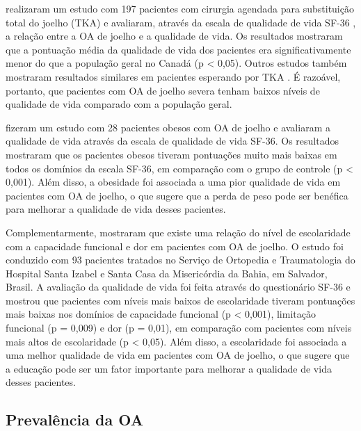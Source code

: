 \cite{Desmeules2009} realizaram um estudo com 197 pacientes com cirurgia agendada para substituição total do joelho (TKA) e avaliaram, através da escala de qualidade de vida SF-36 \citep{Ware1992}, a relação entre a OA de joelho e a qualidade de vida. Os resultados mostraram que a pontuação média da qualidade de vida dos pacientes era significativamente menor do que a população geral no Canadá (p < 0,05). Outros estudos também mostraram resultados similares em pacientes esperando por TKA \citep{Snider2005,Kapetanakis2011}. É razoável, portanto, que pacientes com OA de joelho severa tenham baixos níveis de qualidade de vida comparado com a população geral.

\cite{Sutbeyaz2007} fizeram um estudo com 28 pacientes obesos com OA de joelho e avaliaram a qualidade de vida através da escala de qualidade de vida SF-36. Os resultados mostraram que os pacientes obesos tiveram pontuações muito mais baixas em todos os domínios da escala SF-36, em comparação com o grupo de controle (p < 0,001). Além disso, a obesidade foi associada a uma pior qualidade de vida em pacientes com OA de joelho, o que sugere que a perda de peso pode ser benéfica para melhorar a qualidade de vida desses pacientes.

Complementarmente, \cite{Kawano2015} mostraram que existe uma relação do nível de escolaridade com a capacidade funcional e dor em pacientes com OA de joelho. O estudo foi conduzido com 93 pacientes tratados no Serviço de Ortopedia e Traumatologia do Hospital Santa Izabel e Santa Casa da Misericórdia da Bahia, em Salvador, Brasil. A avaliação da qualidade de vida foi feita através do questionário SF-36 e mostrou que pacientes com níveis mais baixos de escolaridade tiveram pontuações mais baixas nos domínios de capacidade funcional (p < 0,001), limitação funcional (p = 0,009) e dor (p = 0,01), em comparação com pacientes com níveis mais altos de escolaridade (p < 0,05). Além disso, a escolaridade foi associada a uma melhor qualidade de vida em pacientes com OA de joelho, o que sugere que a educação pode ser um fator importante para melhorar a qualidade de vida desses pacientes.

\subsection{Prevalência da OA}

